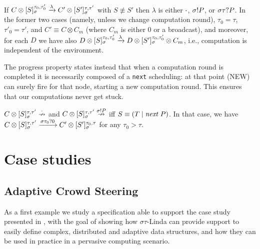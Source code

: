 \documentclass[12pt,a4paper,twoside,openright]{book}
\begin{document}
\begin{property}
If $C\otimes[ S ]_{\sigma}^{\tau_0,\tau'_0}\xrightarrow{\lambda}C'\otimes [ S' ]_{\sigma}^{\tau,\tau'}$ with $S\not\equiv S'$ then $\lambda$ is either $\cdot$, $\sigma!P$, or $\sigma\tau?P$.
%
In the former two cases (namely, unless we change computation round), $\tau_0=\tau$, $\tau'_0=\tau'$, and $C'\equiv C\otimes C_m$ (where $C_m$ is either $0$ or a broadcast), and moreover, for each $D$ we have also 
\mbox{$D\otimes[ S ]_{\sigma}^{\tau_0,\tau'_0}\xrightarrow{\lambda}D\otimes [ S' ]_{\sigma}^{\tau_0,\tau'_0}\otimes C_m$}, i.e., computation is independent of the environment.
\end{property}
\noindent The progress property states instead that when a computation round is completed it is necessarily composed of a \texttt{next} scheduling: at that point (NEW) can surely fire for that node, starting a new computation round. This ensures that our computations never get stuck.

\begin{property}
$C\otimes[ S ]_{\sigma}^{\tau,\tau'}\stackrel{\cdot}{\nrightarrow}$ and $C\otimes[ S ]_{\sigma}^{\tau,\tau'}\stackrel{\sigma!P}{\nrightarrow}$ iff $S\equiv(T\;|\;\textit{next}~P)$. In that case, we have $C\otimes[ S ]_{\sigma}^{\tau,\tau'}\xrightarrow{\sigma\tau_0?0}C'\otimes[ S' ]_{\sigma}^{\tau_0,\tau}$ for any $\tau_0>\tau$.
\end{property}

\section{Case studies}

\subsection{Adaptive Crowd Steering}

As a first example we study a specification able to support the case study presented in \cite{sapereecolaws-sac2012,mass2011}, with the goal of showing how $\sigma\tau$-Linda can provide support to easily define complex, distributed and adaptive data structures, and how they can be used in practice in a pervasive computing scenario.
\end{document}
